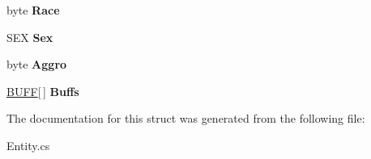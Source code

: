 \begin{DoxyCompactItemize}
\item 
\hypertarget{structffxivlib_1_1_entity_1_1_e_n_t_i_t_y_i_n_f_o_a699875cd7898172929592fd6b407c68c}{byte {\bfseries Race}}\label{structffxivlib_1_1_entity_1_1_e_n_t_i_t_y_i_n_f_o_a699875cd7898172929592fd6b407c68c}

\item 
\hypertarget{structffxivlib_1_1_entity_1_1_e_n_t_i_t_y_i_n_f_o_a53d07d9b89bec006286483c633cfc616}{S\-E\-X {\bfseries Sex}}\label{structffxivlib_1_1_entity_1_1_e_n_t_i_t_y_i_n_f_o_a53d07d9b89bec006286483c633cfc616}

\item 
\hypertarget{structffxivlib_1_1_entity_1_1_e_n_t_i_t_y_i_n_f_o_afb50f40f28a62629c3efc0a1f8057615}{byte {\bfseries Aggro}}\label{structffxivlib_1_1_entity_1_1_e_n_t_i_t_y_i_n_f_o_afb50f40f28a62629c3efc0a1f8057615}

\item 
\hypertarget{structffxivlib_1_1_entity_1_1_e_n_t_i_t_y_i_n_f_o_aeb8a58b94d8da93ab2c21a658d8a1f8e}{\hyperlink{structffxivlib_1_1_b_u_f_f}{B\-U\-F\-F}\mbox{[}$\,$\mbox{]} {\bfseries Buffs}}\label{structffxivlib_1_1_entity_1_1_e_n_t_i_t_y_i_n_f_o_aeb8a58b94d8da93ab2c21a658d8a1f8e}

\end{DoxyCompactItemize}


The documentation for this struct was generated from the following file\-:\begin{DoxyCompactItemize}
\item 
Entity.\-cs\end{DoxyCompactItemize}
